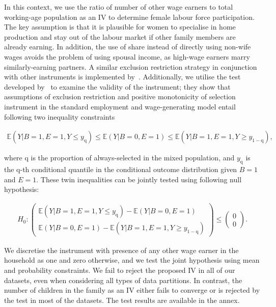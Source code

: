 In this context, we use the ratio of number of other wage earners to total working-age population as an IV to determine female labour force participation. The key assumption is that it is plausible for women to specialise in home production and stay out of the labour market if other family members are already earning. In addition, the use of share instead of directly using non-wife wages avoids the problem of using spousal income, as high-wage earners marry similarly-earning partners. A similar exclusion restriction strategy in conjunction with other instruments is implemented by~\citet{BenYahmed2018}. Additionally, we utilise the test developed by~\citet{Huber2014} to examine the validity of the instrument; they show that assumptions of exclusion restriction and positive monotonicity of selection instrument in the standard employment and wage-generating model entail following two inequality constraints
\begin{linenomath*}\begin{align}
		\mathbb{E}(Y|B=1, E=1, Y\leq y_{\text{q}})  \leq \mathbb{E}(Y|B=0, E=1) \leq  \mathbb{E}(Y|B=1, E=1, Y\geq y_{1-\text{q}}),
\end{align}\end{linenomath*} 
 where  $\text{q}$ is the proportion of always-selected in the mixed population, and $ y_{\text{q}}$ is the $\text{q}$-th conditional quantile in the conditional outcome distribution given $B =1$ and $E = 1$. These twin inequalities can be jointly tested using following null hypothesis: 
\begin{linenomath*}\begin{align}
		H_{0}:  \begin{pmatrix}
			\mathbb{E}(Y|B=1, E=1, Y\leq y_{\text{q}}) - \mathbb{E}(Y|B=0, E=1)  \\
			\mathbb{E}(Y|B=0, E=1) - \mathbb{E}(Y|B=1, E=1, Y\geq y_{1-\text{q}})  
		\end{pmatrix} \leq \begin{pmatrix} 0\\0\end{pmatrix}.
\end{align}\end{linenomath*}  
We discretise the instrument with presence of any other wage earner in the household as one and zero otherwise, and we test the joint hypothesis using mean and probability constraints. We fail to reject the proposed IV in all of our datasets, even when considering all types of data partitions. In contrast, the number of children in the family as an IV either fails to converge or is rejected by the test in most of the datasets. The test results are available in the annex.\par  


